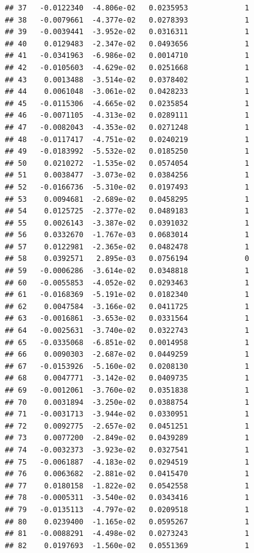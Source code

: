 \documentclass[12pt]{article}\usepackage[]{graphicx}\usepackage[]{xcolor}
\makeatletter
\newenvironment{kframe}{%
 \def\at@end@of@kframe{}%
 \ifinner\ifhmode%
  \def\at@end@of@kframe{\end{minipage}}%
  \begin{minipage}{\columnwidth}%
 \fi\fi%
 \def\FrameCommand##1{\hskip\@totalleftmargin \hskip-\fboxsep
 \colorbox{shadecolor}{##1}\hskip-\fboxsep
     \hskip-\linewidth \hskip-\@totalleftmargin \hskip\columnwidth}%
 \MakeFramed {\advance\hsize-\width
   \@totalleftmargin\z@ \linewidth\hsize
   \@setminipage}}%
 {\par\unskip\endMakeFramed%
 \at@end@of@kframe}
\newenvironment{knitrout}{}{} %
\makeatother
\begin{document}
\begin{knitrout}
\begin{kframe}
\begin{verbatim}
## 37   -0.0122340  -4.806e-02   0.0235953             1
## 38   -0.0079661  -4.377e-02   0.0278393             1
## 39   -0.0039441  -3.952e-02   0.0316311             1
## 40    0.0129483  -2.347e-02   0.0493656             1
## 41   -0.0341963  -6.986e-02   0.0014710             1
## 42   -0.0105603  -4.629e-02   0.0251668             1
## 43    0.0013488  -3.514e-02   0.0378402             1
## 44    0.0061048  -3.061e-02   0.0428233             1
## 45   -0.0115306  -4.665e-02   0.0235854             1
## 46   -0.0071105  -4.313e-02   0.0289111             1
## 47   -0.0082043  -4.353e-02   0.0271248             1
## 48   -0.0117417  -4.751e-02   0.0240219             1
## 49   -0.0183992  -5.532e-02   0.0185250             1
## 50    0.0210272  -1.535e-02   0.0574054             1
## 51    0.0038477  -3.073e-02   0.0384256             1
## 52   -0.0166736  -5.310e-02   0.0197493             1
## 53    0.0094681  -2.689e-02   0.0458295             1
## 54    0.0125725  -2.377e-02   0.0489183             1
## 55    0.0026143  -3.387e-02   0.0391032             1
## 56    0.0332670  -1.767e-03   0.0683014             1
## 57    0.0122981  -2.365e-02   0.0482478             1
## 58    0.0392571   2.895e-03   0.0756194             0
## 59   -0.0006286  -3.614e-02   0.0348818             1
## 60   -0.0055853  -4.052e-02   0.0293463             1
## 61   -0.0168369  -5.191e-02   0.0182340             1
## 62    0.0047584  -3.166e-02   0.0411725             1
## 63   -0.0016861  -3.653e-02   0.0331564             1
## 64   -0.0025631  -3.740e-02   0.0322743             1
## 65   -0.0335068  -6.851e-02   0.0014958             1
## 66    0.0090303  -2.687e-02   0.0449259             1
## 67   -0.0153926  -5.160e-02   0.0208130             1
## 68    0.0047771  -3.142e-02   0.0409735             1
## 69   -0.0012061  -3.760e-02   0.0351838             1
## 70    0.0031894  -3.250e-02   0.0388754             1
## 71   -0.0031713  -3.944e-02   0.0330951             1
## 72    0.0092775  -2.657e-02   0.0451251             1
## 73    0.0077200  -2.849e-02   0.0439289             1
## 74   -0.0032373  -3.923e-02   0.0327541             1
## 75   -0.0061887  -4.183e-02   0.0294519             1
## 76    0.0063682  -2.881e-02   0.0415470             1
## 77    0.0180158  -1.822e-02   0.0542558             1
## 78   -0.0005311  -3.540e-02   0.0343416             1
## 79   -0.0135113  -4.797e-02   0.0209518             1
## 80    0.0239400  -1.165e-02   0.0595267             1
## 81   -0.0088291  -4.498e-02   0.0273243             1
## 82    0.0197693  -1.560e-02   0.0551369             1

\end{verbatim}
\end{kframe}
\end{knitrout}
\end{document}
